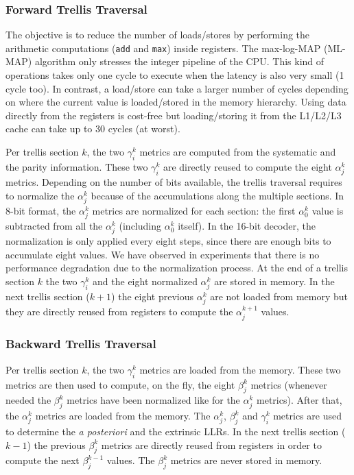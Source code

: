 \subsubsection{Forward Trellis Traversal}

The objective is to reduce the number of loads/stores by performing the
arithmetic computations (\verb|add| and \verb|max|) inside registers. The
max-log-MAP (ML-MAP) algorithm only stresses the integer pipeline of the CPU.
This kind of operations takes only one cycle to execute when the latency is also
very small (1 cycle too). In contrast, a load/store can take a larger number of
cycles depending on where the current value is loaded/stored in the memory
hierarchy. Using data directly from the registers is cost-free but
loading/storing it from the L1/L2/L3 cache can take up to 30 cycles (at worst).

Per trellis section $k$, the two $\gamma_i^k$ metrics are computed from the
systematic and the parity information. These two $\gamma_i^k$ are directly
reused to compute the eight $\alpha_j^k$ metrics. Depending on the number of
bits available, the trellis traversal requires to normalize the $\alpha_j^k$
because of the accumulations along the multiple sections.  In 8-bit format, the
$\alpha_j^k$ metrics are normalized for each section: the first $\alpha_0^k$
value is subtracted from all the $\alpha_j^k$ (including $\alpha_0^k$ itself).
In the 16-bit decoder, the normalization is only applied every eight steps,
since there are enough bits to accumulate eight values. We have observed in
experiments that there is no performance degradation due to the normalization
process. At the end of a trellis section $k$ the two $\gamma_i^k$ and the eight
normalized $\alpha_j^k$ are stored in  memory. In the next trellis section
($k+1$) the eight previous $\alpha_j^k$ are not loaded from memory but they are
directly reused from registers to compute the $\alpha_j^{k+1}$ values.

\subsubsection{Backward Trellis Traversal}

Per trellis section $k$, the two $\gamma_i^k$ metrics are loaded from the
memory. These two metrics are then used to compute, on the fly, the eight
$\beta_j^k$ metrics (whenever needed the $\beta_j^k$ metrics have been
normalized like for the $\alpha_j^k$ metrics). After that, the $\alpha_j^k$
metrics are loaded from the memory. The $\alpha_j^k$, $\beta_j^k$ and
$\gamma_i^k$ metrics are used to determine the \textit{a posteriori} and the
extrinsic LLRs. In the next trellis section ($k-1$) the previous $\beta_j^k$
metrics are directly reused from registers in order to compute the next
$\beta_j^{k-1}$ values. The $\beta_j^k$ metrics are never stored in memory.


